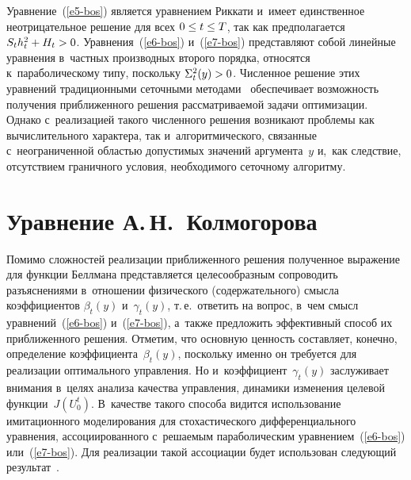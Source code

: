 \begin{multicols}{2}
     
     Уравнение~(\ref{e5-bos}) является уравнением Риккати и~имеет 
единственное неотрицательное решение для всех $0\hm\leq t\hm\leq T$, так 
как предполагается $S_t h_t^2\hm+H_t\hm>0$. Уравнения~(\ref{e6-bos}) 
и~(\ref{e7-bos}) представляют собой линейные уравнения в~частных 
производных второго порядка, относятся к~параболическому типу, поскольку 
$\Sigma_t^2(y)\hm>0$. Численное решение этих уравнений традиционными 
сеточными методами~\cite{2-bos} обеспечивает возможность получения 
приближенного решения рассматриваемой задачи оптимизации. Однако 
с~реализацией такого чис\-лен\-но\-го решения возникают проблемы как 
вычислительного характера, так и~алгоритмического, связанные 
с~неограниченной областью допустимых значений аргумента~$y$ и,~как 
следствие, отсутствием граничного условия, необходимого сеточному 
алгоритму.

\section{Уравнение А.\,Н.~Колмогорова}

     Помимо сложностей реализации приближенного решения полученное 
выражение для функции Беллмана представляется целесообразным 
сопроводить разъяснениями в~отношении физического (содержательного) 
смысла коэффициентов $\beta_t(y)$ и~$\gamma_t(y)$, т.\,е.\ ответить на вопрос, 
в~чем смысл уравнений~(\ref{e6-bos}) и~(\ref{e7-bos}), а~также предложить 
эффективный способ их приближенного решения. Отметим, что основную 
ценность составляет, конечно, определение коэффициента~$\beta_t(y)$, 
поскольку именно он требуется для реализации оптимального управления. 
Но и~коэффициент~$\gamma_t(y)$ заслуживает внимания в~целях анализа 
качества управления, динамики изменения целевой функции~$J(U_0^t)$. 
В~качестве такого способа видится использование имитационного 
моделирования для стохастического дифференциального уравнения, 
ассоциированного с~решаемым параболическим уравнением~(\ref{e6-bos}) 
или~(\ref{e7-bos}). Для реализации такой ассоциации будет использован 
следующий результат~\cite{3-bos}.
     

\end{multicols}
